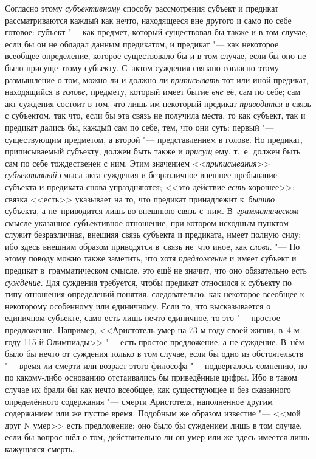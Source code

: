 Согласно этому {\em субъективному}
способу рассмотрения субъект и предикат рассматриваются
каждый как нечто, находящееся вне другого и само по себе готовое: субъект
"--- как предмет, который существовал бы также и в том случае,
если бы он не обладал данным предикатом, и предикат "--- как
некоторое всеобщее определение, которое существовало бы и в том случае,
если бы оно не было присуще этому субъекту. С~актом суждения связано
согласно этому размышление о том, можно ли и должно ли
{\em приписывать} тот или иной предикат, находящийся в
{\em голове,} предмету, который имеет бытие {\em вне}
её, сам по себе; сам акт суждения состоит в том, что лишь им
некоторый предикат {\em приводится}
в связь с субъектом, так что, если бы эта связь не получила
места, то как субъект, так и предикат дались бы, каждый сам по себе, тем,
что они суть: первый "--- существующим предметом, а второй
"--- представлением в голове. Но предикат, приписываемый
субъекту, должен быть также и {\em присущ} ему, т.~е.
должен быть сам по себе тождественен с ним. Этим значением
<<{\em приписывания}>> {\em субъективный} смысл
акта суждения и безразличное внешнее пребывание субъекта и предиката снова
упраздняются; <<это действие {\em есть} хорошее>>; связка <<есть>> указывает
на то, что предикат принадлежит к~{\em бытию} субъекта, а не~приводится лишь
во внешнюю связь с~ним. В~{\em грамматическом} смысле указанное субъективное
отношение, при котором исходным пунктом служит безразличная, внешняя связь
субъекта и предиката, имеет полную силу; ибо здесь внешним образом приводятся
в~связь не~что иное, как {\em слова}. "--- По этому поводу можно также
заметить, что хотя {\em предложение} и имеет субъект и предикат
в~грамматическом смысле, это ещё не значит, что оно обязательно есть
{\em суждение}. Для суждения требуется, чтобы предикат относился к субъекту
по типу отношения определений понятия, следовательно, как некоторое
всеобщее к некоторому особенному или единичному. Если то,
что высказывается о единичном субъекте, само есть лишь нечто единичное, то
это "--- простое предложение. Например, <<Аристотель умер на 73-м году своей
жизни, в~4-м году 115-й
Олимпиады>> "--- есть простое предложение, а не суждение. В~нём было бы нечто
от суждения только в том случае, если бы одно из обстоятельств "--- время ли
смерти или возраст этого философа "--- подвергалось сомнению, но по какому-либо
основанию отстаивались бы приведённые цифры. Ибо в таком случае их брали бы как
нечто всеобщее, как существующее и без сказанного определённого содержания "---
смерти Аристотеля, наполненное другим содержанием или же пустое время. Подобным
же образом известие "--- <<мой друг N умер>> есть предложение; оно было бы
суждением лишь в том случае, если бы вопрос шёл о том, действительно ли он умер
или же здесь имеется лишь кажущаяся смерть.


